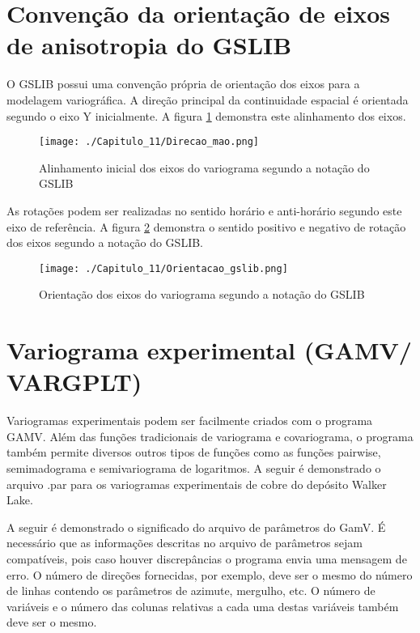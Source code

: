 \section{Convenção da orientação de eixos de anisotropia do GSLIB} \label{orient}

O GSLIB possui uma convenção própria de orientação dos eixos para a modelagem variográfica. A direção principal da continuidade espacial é orientada segundo o eixo Y inicialmente. A figura \ref{alinhamento} demonstra este alinhamento dos eixos. 

\FloatBarrier
\begin{figure}[h]
	\centering
	\texttt{[image: ./Capitulo\_11/Direcao\_mao.png]}	
	\caption{ Alinhamento inicial dos eixos do variograma segundo a notação do GSLIB}
	\label{alinhamento}
\end{figure}
\FloatBarrier

As rotações podem ser realizadas no sentido horário e anti-horário segundo este eixo de referência. A figura \ref{Orientacao} demonstra o sentido positivo e negativo de rotação dos eixos segundo a notação do GSLIB. 

\FloatBarrier
\begin{figure}[h]
	\centering
	\texttt{[image: ./Capitulo\_11/Orientacao\_gslib.png]}	
	\caption{ Orientação dos eixos do variograma segundo a notação do GSLIB}
	\label{Orientacao}
\end{figure}
\FloatBarrier

\section{Variograma experimental (GAMV/ VARGPLT) }

Variogramas experimentais podem ser facilmente criados com o programa GAMV. Além das funções tradicionais de variograma e covariograma, o programa também permite diversos outros tipos de funções como as funções pairwise, semimadograma e semivariograma de logaritmos. A seguir é demonstrado o arquivo .par para os variogramas experimentais de cobre do depósito Walker Lake.

\begin{small}
	\begingroup
	
	\endgroup
\end{small}

A seguir é demonstrado o significado do arquivo de parâmetros do GamV. É necessário que as informações descritas no arquivo de parâmetros sejam compatíveis, pois caso houver discrepâncias o programa envia uma mensagem de erro. O número de direções fornecidas, por exemplo, deve ser o mesmo do número de linhas contendo os parâmetros de azimute, mergulho, etc. O número de variáveis e o número das colunas relativas a cada uma destas variáveis também deve ser o mesmo. 

